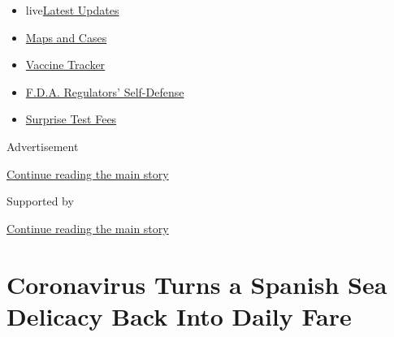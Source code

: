 \begin{itemize}
\tightlist
\item
  live\href{https://www.nytimes3xbfgragh.onion/2020/09/11/world/covid-19-coronavirus.html?name=styln-coronavirus-national\&region=TOP_BANNER\&block=storyline_menu_recirc\&action=click\&pgtype=Article\&impression_id=f55c9371-f4be-11ea-bb8b-6f96f58b56bb\&variant=undefined}{Latest
  Updates}
\item
  \href{https://www.nytimes3xbfgragh.onion/interactive/2020/us/coronavirus-us-cases.html?name=styln-coronavirus-national\&region=TOP_BANNER\&block=storyline_menu_recirc\&action=click\&pgtype=Article\&impression_id=f55cba80-f4be-11ea-bb8b-6f96f58b56bb\&variant=undefined}{Maps
  and Cases}
\item
  \href{https://www.nytimes3xbfgragh.onion/interactive/2020/science/coronavirus-vaccine-tracker.html?name=styln-coronavirus-national\&region=TOP_BANNER\&block=storyline_menu_recirc\&action=click\&pgtype=Article\&impression_id=f55cba81-f4be-11ea-bb8b-6f96f58b56bb\&variant=undefined}{Vaccine
  Tracker}
\item
  \href{https://www.nytimes3xbfgragh.onion/2020/09/10/us/politics/fda-coronavirus-vaccine.html?name=styln-coronavirus-national\&region=TOP_BANNER\&block=storyline_menu_recirc\&action=click\&pgtype=Article\&impression_id=f55cba82-f4be-11ea-bb8b-6f96f58b56bb\&variant=undefined}{F.D.A.
  Regulators' Self-Defense}
\item
  \href{https://www.nytimes3xbfgragh.onion/2020/09/09/upshot/coronavirus-surprise-test-fees.html?name=styln-coronavirus-national\&region=TOP_BANNER\&block=storyline_menu_recirc\&action=click\&pgtype=Article\&impression_id=f55cba83-f4be-11ea-bb8b-6f96f58b56bb\&variant=undefined}{Surprise
  Test Fees}
\end{itemize}

Advertisement

\protect\hyperlink{after-top}{Continue reading the main story}

Supported by

\protect\hyperlink{after-sponsor}{Continue reading the main story}

\hypertarget{coronavirus-turns-a-spanish-sea-delicacy-back-into-daily-fare}{%
\section{Coronavirus Turns a Spanish Sea Delicacy Back Into Daily
Fare}\label{coronavirus-turns-a-spanish-sea-delicacy-back-into-daily-fare}}

